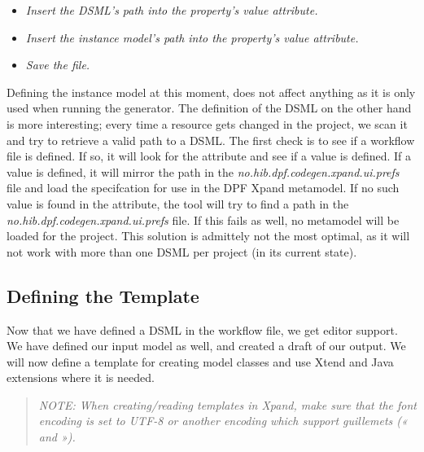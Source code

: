 \begin{itemize}
  \item \emph{Insert the DSML's path  into the\newline {} property's value attribute.}
  \item \emph{Insert the instance model's path  into the\newline {} property's value attribute.}
  \item \emph{Save the file.}
\end{itemize}
Defining the instance model at this moment, does not affect anything as it is only used when running the generator. The definition of the DSML on the other hand is more interesting; every time a resource gets changed in the project, we scan it and try to retrieve a valid path to a DSML. The first check is to see if a workflow file is defined. If so, it will look for the  attribute and see if a value is defined. If a value is defined, it will mirror the path in the \emph{no.hib.dpf.codegen.xpand.ui.prefs} file and load the specifcation for use in the DPF Xpand metamodel. If no such value is found in the attribute, the tool will try to find a path in the \emph{no.hib.dpf.codegen.xpand.ui.prefs} file. If this fails as well, no metamodel will be loaded for the project. This solution is admittely not the most optimal, as it will not work with more than one DSML per project (in its current state).

\subsection{Defining the Template}
Now that we have defined a DSML in the workflow file, we get editor support. We have defined our input model as well, and created a draft of our output. We will now define a template for creating model classes and use Xtend and Java extensions where it is needed.

\begin{quote}
  \emph{NOTE: When creating/reading templates in Xpand, make sure that the font encoding is set to UTF-8 or another encoding which support \emph{guillemets} (« and »).}
\end{quote}

